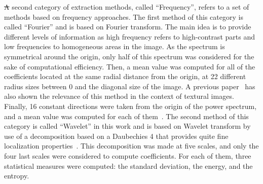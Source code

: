 \documentclass[journal,article,accept,moreauthors,pdftex, applsci]{Definitions/mdpi}
\providecommand{\DIFadd}[1]{{\protect\color{blue}\uwave{#1}}} %
\providecommand{\DIFdel}[1]{{\protect\color{red}\sout{#1}}}                      %
\providecommand{\DIFaddbegin}{} %
\providecommand{\DIFaddend}{} %
\providecommand{\DIFdelbegin}{} %
\providecommand{\DIFdelend}{} %
\begin{document}
\DIFdelbegin \DIFdel{A }\DIFdelend \DIFaddbegin \DIFadd{The }\DIFaddend second category of extraction methods, called “Frequency”, refers to a set of methods based on frequency approaches. The first method of this category is called “Fourier” and is based on \DIFaddbegin \DIFadd{the }\DIFaddend Fourier transform. The main idea is to provide different levels of information as high frequency refers to high-contrast parts and low frequencies to homogeneous areas in the image. As the spectrum is symmetrical around the origin, only half of this spectrum was considered for the sake of computational efficiency. Then, a mean value was computed for all of the coefficients located at the same radial distance from the origin, at 22 different radius sizes between 0 and the diagonal size of the image. A previous paper~\cite{Smach2008a} has also shown the relevance of this method in the context of textural images. Finally, 16 constant directions were taken from the origin of the power spectrum, and a mean value was computed for each of them~\cite{Wiltgen2008}. The second method of this category is called “Wavelet” in this work and is based on Wavelet transform by use of a decomposition based on a Daubechies 4 that provides quite fine localization properties~\cite{Wiltgen2008}. This decomposition was made at five scales, and only the four last scales were considered to compute coefficients. For each of them, three statistical measures were computed: the standard deviation, the energy, and the entropy.\par
                    \DIFdelbegin %
\end{document}
